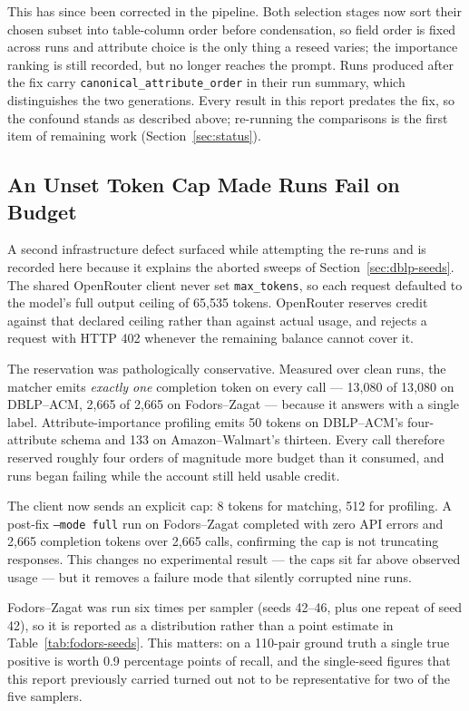 \documentclass[11pt]{article}
\begin{document}
This has since been corrected in the pipeline. Both selection stages now sort their
chosen subset into table-column order before condensation, so field order is fixed
across runs and attribute choice is the only thing a reseed varies; the
importance ranking is still recorded, but no longer reaches the prompt. Runs produced
after the fix carry \texttt{canonical\_attribute\_order} in their run summary, which
distinguishes the two generations. Every result in this report predates the fix, so
the confound stands as described above; re-running the comparisons is the first item
of remaining work (Section~\ref{sec:status}).

\subsection{An Unset Token Cap Made Runs Fail on Budget}
\label{sec:maxtokens}

A second infrastructure defect surfaced while attempting the re-runs and is recorded
here because it explains the aborted sweeps of Section~\ref{sec:dblp-seeds}. The
shared OpenRouter client never set \texttt{max\_tokens}, so each request defaulted to
the model's full output ceiling of 65{,}535 tokens. OpenRouter reserves credit against
that declared ceiling rather than against actual usage, and rejects a request with
HTTP 402 whenever the remaining balance cannot cover it.

The reservation was pathologically conservative. Measured over clean runs, the matcher
emits \emph{exactly one} completion token on every call --- 13{,}080 of 13{,}080 on
DBLP--ACM, 2{,}665 of 2{,}665 on Fodors--Zagat --- because it answers with a single
label. Attribute-importance profiling emits 50 tokens on DBLP--ACM's four-attribute
schema and 133 on Amazon--Walmart's thirteen. Every call therefore reserved roughly
four orders of magnitude more budget than it consumed, and runs began failing while
the account still held usable credit.

The client now sends an explicit cap: 8 tokens for matching, 512 for profiling. A
post-fix \texttt{--mode full} run on Fodors--Zagat completed with zero API errors and
2{,}665 completion tokens over 2{,}665 calls, confirming the cap is not truncating
responses. This changes no experimental result --- the caps sit far above observed
usage --- but it removes a failure mode that silently corrupted nine runs.

Fodors--Zagat was run six times per sampler (seeds 42--46, plus one repeat of seed
42), so it is reported as a distribution rather than a point estimate in
Table~\ref{tab:fodors-seeds}. This matters: on a 110-pair ground truth a single true
positive is worth 0.9 percentage points of recall, and the single-seed figures that
this report previously carried turned out not to be representative for two of the
five samplers.
\end{document}
